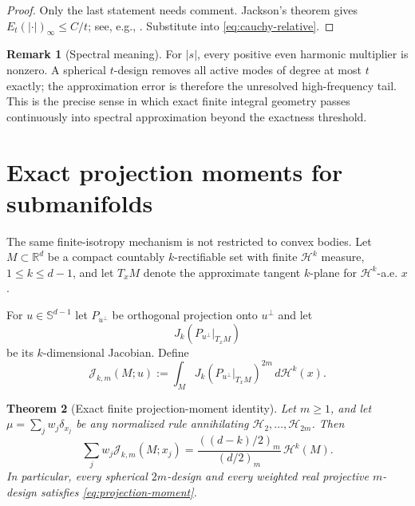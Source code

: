\documentclass[12pt,a4paper]{article}
\newcommand{\Sph}{\mathbb S}
\newcommand{\R}{\mathbb R}
\newcommand{\Harm}{\mathcal H}
\theoremstyle{plain}
\newtheorem{theorem}{Theorem}[section]
\theoremstyle{definition}
\newtheorem{remark}[theorem]{Remark}
\begin{document}
\begin{proof}
Only the last statement needs comment.  Jackson's theorem gives $E_t(|\cdot|)_\infty\le C/t$; see, e.g., \cite{DeVoreLorentz}.  Substitute into \eqref{eq:cauchy-relative}.
\end{proof}

\begin{remark}[Spectral meaning]
For $|s|$, every positive even harmonic multiplier is nonzero.  A spherical $t$-design removes all active modes of degree at most $t$ exactly; the approximation error is therefore the unresolved high-frequency tail.  This is the precise sense in which exact finite integral geometry passes continuously into spectral approximation beyond the exactness threshold.
\end{remark}

\section{Exact projection moments for submanifolds}

The same finite-isotropy mechanism is not restricted to convex bodies.  Let $M\subset\R^d$ be a compact countably $k$-rectifiable set with finite $\mathcal H^k$ measure, $1\le k\le d-1$, and let $T_xM$ denote the approximate tangent $k$-plane for $\mathcal H^k$-a.e. $x$.

For $u\in\Sph^{d-1}$ let $P_{u^\perp}$ be orthogonal projection onto $u^\perp$ and let
\[
 J_k(P_{u^\perp}|_{T_xM})
\]
be its $k$-dimensional Jacobian.  Define
\begin{equation}\label{eq:Jkm}
 \mathcal J_{k,m}(M;u)
 :=\int_M J_k(P_{u^\perp}|_{T_xM})^{2m}\,d\mathcal H^k(x).
\end{equation}

\begin{theorem}[Exact finite projection-moment identity]\label{thm:projection-moment}
Let $m\ge1$, and let $\mu=\sum_jw_j\delta_{x_j}$ be any normalized rule annihilating $\Harm_2,\ldots,\Harm_{2m}$.  Then
\begin{equation}\label{eq:projection-moment}
 \boxed{
 \sum_jw_j\mathcal J_{k,m}(M;x_j)
 =\frac{((d-k)/2)_m}{(d/2)_m}\,\mathcal H^k(M).
 }
\end{equation}
In particular, every spherical $2m$-design and every weighted real projective $m$-design satisfies \eqref{eq:projection-moment}.
\end{theorem}
\end{document}
